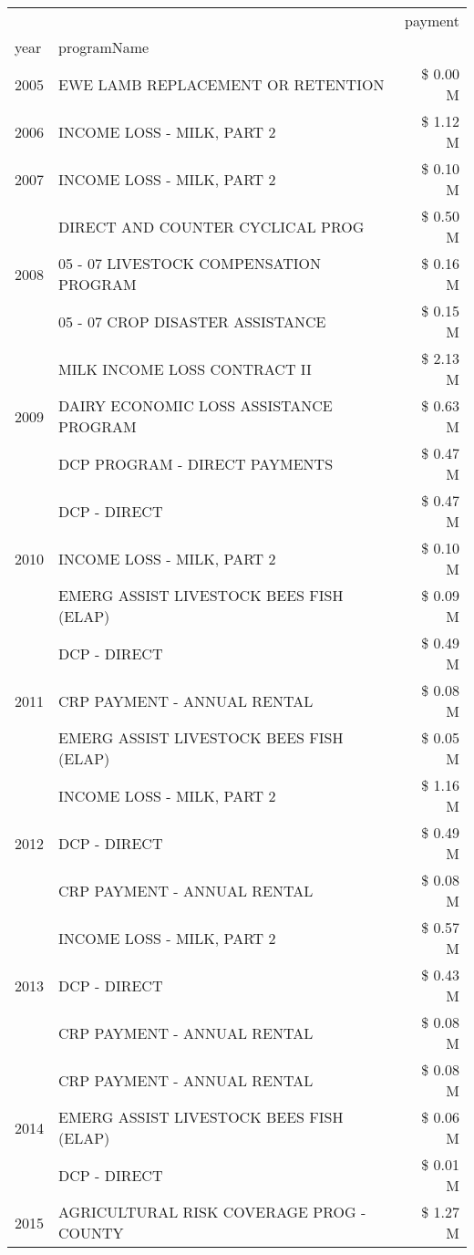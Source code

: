 \begin{tabular}{llr}
\toprule
 &  & payment \\
year & programName &  \\
\midrule
2005 & EWE LAMB REPLACEMENT OR RETENTION & \$ 0.00 M \\
\cline{1-3}
2006 & INCOME LOSS - MILK, PART 2 & \$ 1.12 M \\
\cline{1-3}
2007 & INCOME LOSS - MILK, PART 2 & \$ 0.10 M \\
\cline{1-3}
\multirow[t]{3}{*}{2008} & DIRECT AND COUNTER CYCLICAL PROG & \$ 0.50 M \\
 & 05 - 07 LIVESTOCK COMPENSATION PROGRAM & \$ 0.16 M \\
 & 05 - 07 CROP DISASTER ASSISTANCE & \$ 0.15 M \\
\cline{1-3}
\multirow[t]{3}{*}{2009} & MILK INCOME LOSS CONTRACT II & \$ 2.13 M \\
 & DAIRY ECONOMIC LOSS ASSISTANCE PROGRAM & \$ 0.63 M \\
 & DCP PROGRAM - DIRECT PAYMENTS & \$ 0.47 M \\
\cline{1-3}
\multirow[t]{3}{*}{2010} & DCP - DIRECT & \$ 0.47 M \\
 & INCOME LOSS - MILK, PART 2 & \$ 0.10 M \\
 & EMERG ASSIST LIVESTOCK BEES FISH (ELAP) & \$ 0.09 M \\
\cline{1-3}
\multirow[t]{3}{*}{2011} & DCP - DIRECT & \$ 0.49 M \\
 & CRP PAYMENT - ANNUAL RENTAL & \$ 0.08 M \\
 & EMERG ASSIST LIVESTOCK BEES FISH (ELAP) & \$ 0.05 M \\
\cline{1-3}
\multirow[t]{3}{*}{2012} & INCOME LOSS - MILK, PART 2 & \$ 1.16 M \\
 & DCP - DIRECT & \$ 0.49 M \\
 & CRP PAYMENT - ANNUAL RENTAL & \$ 0.08 M \\
\cline{1-3}
\multirow[t]{3}{*}{2013} & INCOME LOSS - MILK, PART 2 & \$ 0.57 M \\
 & DCP - DIRECT & \$ 0.43 M \\
 & CRP PAYMENT - ANNUAL RENTAL & \$ 0.08 M \\
\cline{1-3}
\multirow[t]{3}{*}{2014} & CRP PAYMENT - ANNUAL RENTAL & \$ 0.08 M \\
 & EMERG ASSIST LIVESTOCK BEES FISH (ELAP) & \$ 0.06 M \\
 & DCP - DIRECT & \$ 0.01 M \\
\cline{1-3}
\multirow[t]{3}{*}{2015} & AGRICULTURAL RISK COVERAGE PROG - COUNTY & \$ 1.27 M \\

\end{tabular}
